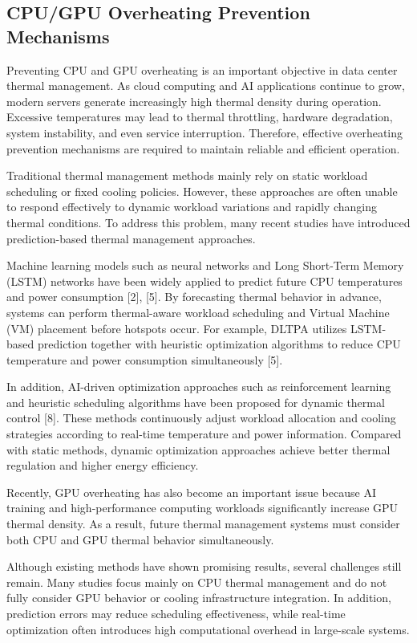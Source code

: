 \documentclass[conference]{IEEEtran}
\begin{document}
\subsection{CPU/GPU Overheating Prevention Mechanisms}
Preventing CPU and GPU overheating is an important objective in data center thermal management. As cloud computing and AI applications continue to grow, modern servers generate increasingly high thermal density during operation. Excessive temperatures may lead to thermal throttling, hardware degradation, system instability, and even service interruption. Therefore, effective overheating prevention mechanisms are required to maintain reliable and efficient operation.

Traditional thermal management methods mainly rely on static workload scheduling or fixed cooling policies. However, these approaches are often unable to respond effectively to dynamic workload variations and rapidly changing thermal conditions. To address this problem, many recent studies have introduced prediction-based thermal management approaches.

Machine learning models such as neural networks and Long Short-Term Memory (LSTM) networks have been widely applied to predict future CPU temperatures and power consumption [2], [5]. By forecasting thermal behavior in advance, systems can perform thermal-aware workload scheduling and Virtual Machine (VM) placement before hotspots occur. For example, DLTPA utilizes LSTM-based prediction together with heuristic optimization algorithms to reduce CPU temperature and power consumption simultaneously [5].

In addition, AI-driven optimization approaches such as reinforcement learning and heuristic scheduling algorithms have been proposed for dynamic thermal control [8]. These methods continuously adjust workload allocation and cooling strategies according to real-time temperature and power information. Compared with static methods, dynamic optimization approaches achieve better thermal regulation and higher energy efficiency.

Recently, GPU overheating has also become an important issue because AI training and high-performance computing workloads significantly increase GPU thermal density. As a result, future thermal management systems must consider both CPU and GPU thermal behavior simultaneously.

Although existing methods have shown promising results, several challenges still remain. Many studies focus mainly on CPU thermal management and do not fully consider GPU behavior or cooling infrastructure integration. In addition, prediction errors may reduce scheduling effectiveness, while real-time optimization often introduces high computational overhead in large-scale systems.
\end{document}
